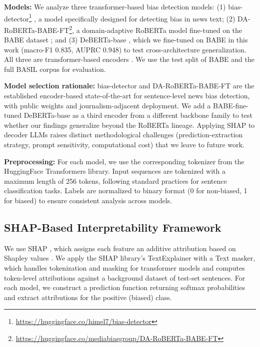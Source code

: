 \documentclass[11pt]{article}
\begin{document}
\textbf{Models:} We analyze three transformer-based bias detection 
models: (1) bias-detector\footnote{\url{https://huggingface.co/himel7/bias-detector}} 
\cite{ghosh2025}, a model specifically designed for detecting bias 
in news text; (2) DA-RoBERTa-BABE-FT\footnote{\url{https://huggingface.co/mediabiasgroup/DA-RoBERTa-BABE-FT}}, 
a domain-adaptive RoBERTa model \cite{liu2019robertarobustlyoptimizedbert} 
fine-tuned on the BABE dataset \cite{Krieger2022}; and (3) 
DeBERTa-base \cite{he2021deberta}, which we fine-tuned on BABE in this 
work (macro-F1 0.835, AUPRC 0.948) to test cross-architecture 
generalization. All three are transformer-based encoders 
\cite{vaswani, devlin-etal-2019-bert}. We use the test split of BABE 
and the full BASIL corpus for evaluation.

\textbf{Model selection rationale:} bias-detector and 
DA-RoBERTa-BABE-FT are the established encoder-based 
state-of-the-art for sentence-level news bias detection, with public 
weights and journalism-adjacent deployment. We add a BABE-fine-tuned 
DeBERTa-base as a third encoder from a different backbone family to 
test whether our findings generalize beyond the RoBERTa lineage. 
Applying SHAP to decoder LLMs raises distinct methodological 
challenges (prediction-extraction strategy, prompt sensitivity, 
computational cost) that we leave to future work.


\textbf{Preprocessing:} For each model, we use the corresponding 
tokenizer from the HuggingFace Transformers library. Input sequences 
are tokenized with a maximum length of 256 tokens, following standard 
practices for sentence classification tasks. Labels are normalized to 
binary format (0 for non-biased, 1 for biased) to ensure consistent 
analysis across models.

\subsection{SHAP-Based Interpretability Framework}
We use SHAP \cite{lundberg2017unifiedapproachinterpretingmodel}, which 
assigns each feature an additive attribution based on Shapley values 
\cite{shapley1953}. We apply the SHAP library's TextExplainer with a 
Text masker, which handles tokenization and masking for transformer 
models and computes token-level attributions against a background 
dataset of test-set sentences. For each model, we construct a 
prediction function returning softmax probabilities and extract 
attributions for the positive (biased) class.
\end{document}
